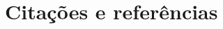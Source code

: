 \documentclass[doutorado, spanish, brazil, english]{packages/icmc}
\begin{document}
\chapter{Citações e referências}
\label{chapter:citacoes}



% 

\postextual




%
\glsaddall
\printglossaries


\begin{apendicesenv}

%    
    
%    

\end{apendicesenv}



\begin{anexosenv}


\end{anexosenv}
\end{document}
